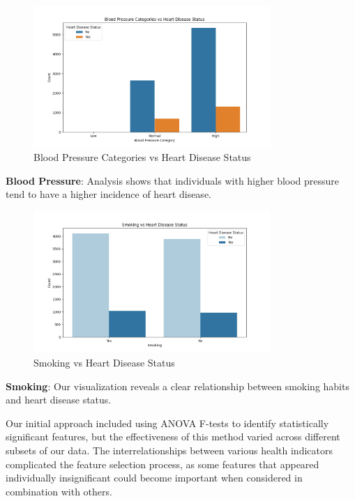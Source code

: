 \documentclass[11pt,a4paper]{article}
\begin{document}
\begin{figure}[H]
    \centering
    \includegraphics[width=0.8\textwidth]{./pictures/blood_pressure_categories_vs_heart_disease_status.png}
    \caption{Blood Pressure Categories vs Heart Disease Status}
\end{figure}

\textbf{Blood Pressure}: Analysis shows that individuals with higher blood pressure tend to have a higher incidence of heart disease.

\begin{figure}[H]
    \centering
    \includegraphics[width=0.8\textwidth]{./pictures/smoking_vs_heart_disease_status.png}
    \caption{Smoking vs Heart Disease Status}
\end{figure}

\textbf{Smoking}: Our visualization reveals a clear relationship between smoking habits and heart disease status.

Our initial approach included using ANOVA
F-tests to identify statistically significant features, but the
effectiveness of this method varied across different subsets
of our data.
The interrelationships between various health indicators complicated the feature
selection process, as some features that appeared
individually insignificant could become important when
considered in combination with others.
\end{document}
